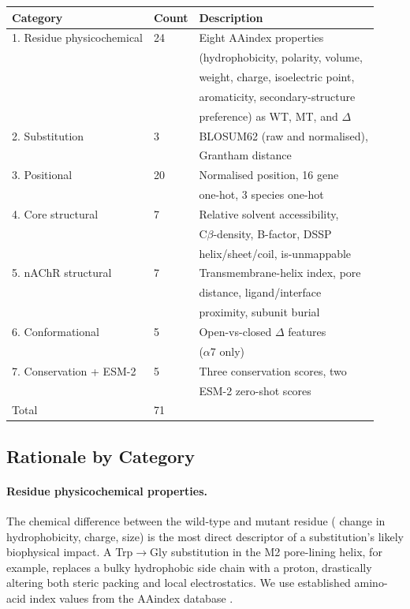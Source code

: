 \documentclass{ws-procs11x85}
\begin{document}
\begin{table}[ht]
{\begin{tabular}{@{}lll@{}}
\toprule
Category & Count & Description \\
\midrule
1. Residue physicochemical & 24 & Eight AAindex properties \\
   && (hydrophobicity, polarity, volume, \\
   && weight, charge, isoelectric point, \\
   && aromaticity, secondary-structure \\
   && preference) as WT, MT, and $\Delta$ \\
2. Substitution            & 3  & BLOSUM62 (raw and normalised), \\
   && Grantham distance \\
3. Positional              & 20 & Normalised position, 16 gene \\
   && one-hot, 3 species one-hot \\
4. Core structural         & 7  & Relative solvent accessibility, \\
   && C$\beta$-density, B-factor, DSSP \\
   && helix/sheet/coil, is-unmappable \\
5. nAChR structural        & 7  & Transmembrane-helix index, pore \\
   && distance, ligand/interface \\
   && proximity, subunit burial \\
6. Conformational          & 5  & Open-vs-closed $\Delta$ features \\
   && ($\alpha$7 only) \\
7. Conservation + ESM-2    & 5  & Three conservation scores, two \\
   && ESM-2 zero-shot scores \\
\bottomrule
Total                      & 71 & \\
\bottomrule
\end{tabular}}
\label{tab:features}
\end{table}

\subsection{Rationale by Category}

\paragraph{Residue physicochemical properties.}
The chemical difference between the wild-type and mutant residue (
change in hydrophobicity, charge, size) is the most direct descriptor
of a substitution's likely biophysical impact. A Trp$\to$Gly substitution
in the M2 pore-lining helix, for example, replaces a bulky hydrophobic
side chain with a proton, drastically altering both steric packing and
local electrostatics. We use established amino-acid index values from
the AAindex database \cite{aaindex}.
\end{document}
